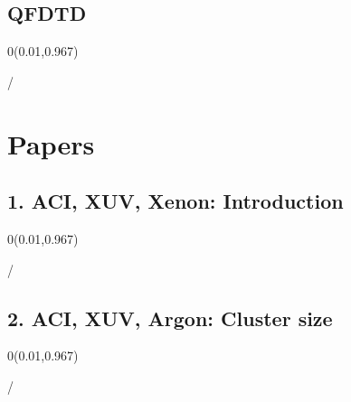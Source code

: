 \documentclass{beamer}
\makeatletter
\newcommand{\framenumber}{
\begin{textblock}{0}(0.01,0.967)
\begin{scriptsize}
{\color{gray}\insertframenumber/\inserttotalframenumber}
\end{scriptsize}
\end{textblock}
}
\makeatother
\begin{document}
\subsection{QFDTD}
\begin{frame}{}\framenumber
\end{frame}


\section{Papers}

\subsection{1. ACI, XUV, Xenon: Introduction}
\begin{frame}{}\framenumber
\end{frame}

\subsection{2. ACI, XUV, Argon: Cluster size}
\begin{frame}{}\framenumber
\end{frame}

\end{document}
